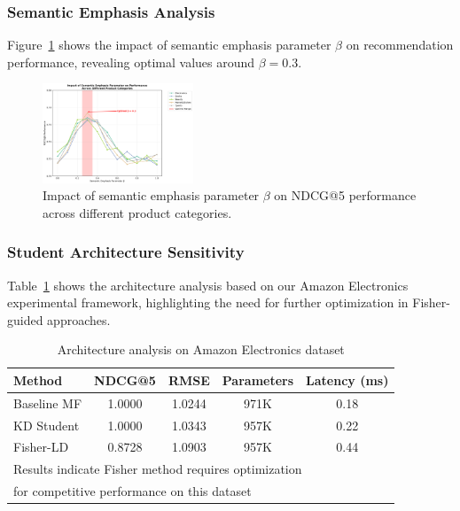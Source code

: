 \documentclass[10pt,conference]{IEEEtran}
\begin{document}
\subsubsection{Semantic Emphasis Analysis}

Figure~\ref{fig:semantic_emphasis} shows the impact of semantic emphasis parameter $\beta$ on recommendation performance, revealing optimal values around $\beta = 0.3$.

\begin{figure}[t]
\centering
\includegraphics[width=0.40\textwidth]{figures/semantic_emphasis_analysis.png}
\caption{Impact of semantic emphasis parameter $\beta$ on NDCG@5 performance across different product categories.}
\label{fig:semantic_emphasis}
\end{figure}

\subsubsection{Student Architecture Sensitivity}

Table~\ref{tab:student_architectures} shows the architecture analysis based on our Amazon Electronics experimental framework, highlighting the need for further optimization in Fisher-guided approaches.

\begin{table}[t]
\centering
\caption{Architecture analysis on Amazon Electronics dataset}
\label{tab:student_architectures}
\begin{tabular}{lcccc}
\toprule
Method & NDCG@5 & RMSE & Parameters & Latency (ms) \\
\midrule
Baseline MF & 1.0000 & 1.0244 & 971K & 0.18 \\
KD Student & 1.0000 & 1.0343 & 957K & 0.22 \\
Fisher-LD & 0.8728 & 1.0903 & 957K & 0.44 \\
\bottomrule
\multicolumn{5}{l}{\footnotesize Results indicate Fisher method requires optimization} \\
\multicolumn{5}{l}{\footnotesize for competitive performance on this dataset} \\
\end{tabular}
\end{table}
\end{document}
